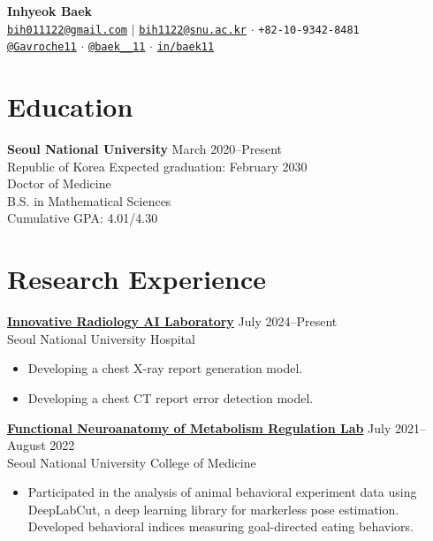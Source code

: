 \documentclass[10pt, a4paper]{article}
\newenvironment{customitemize}
	{\begin{itemize}[leftmargin=*, noitemsep, topsep=0pt, label=$\cdot$]}
	{\end{itemize}}
\begin{document}
\begin{center}
    {\Large\textbf{\color{mycolor}Inhyeok Baek}} \\[2mm]
    \small
    \faEnvelope\hspace{1mm}\href{mailto:bih011122@gmail.com}{\texttt{bih011122@gmail.com}} $\vert$ \href{mailto:bih1122@snu.ac.kr}{\texttt{bih1122@snu.ac.kr}}
    \hspace{2mm}$\cdot$\hspace{2mm}
    \faPhone\hspace{1mm}\texttt{+82-10-9342-8481} \\[1mm]
    \faGithub\hspace{1mm}\href{https://github.com/gavroche11}{\texttt{@Gavroche11}}
    \hspace{2mm}$\cdot$\hspace{2mm}
    {}\hspace{1mm}\href{https://x.com/baek__11}{\texttt{@baek\_\_11}}
    \hspace{2mm}$\cdot$\hspace{2mm}
    \faLinkedin\hspace{1mm}\href{https://www.linkedin.com/in/baek11/}{\texttt{in/baek11}}
\end{center}

\section*{Education}
\textbf{Seoul National University} \hfill March 2020--Present \\
Republic of Korea \hfill Expected graduation: February 2030 \smallskip\\
Doctor of Medicine\\
B.S. in Mathematical Sciences \smallskip\\
Cumulative GPA: 4.01/4.30

\section*{Research Experience}
\textbf{\href{http://irail.snu.ac.kr}{Innovative Radiology AI Laboratory}} \hfill July 2024--Present\\
Seoul National University Hospital \smallskip
\begin{customitemize}
    \item Developing a chest X-ray report generation model.
    \item Developing a chest CT report error detection model.
\end{customitemize}
\bigskip
\textbf{\href{https://fnmr.snu.ac.kr/}{Functional Neuroanatomy of Metabolism Regulation Lab}} \hfill July 2021--August 2022\\
Seoul National University College of Medicine \smallskip
\begin{customitemize}
    \item Participated in the analysis of animal behavioral experiment data using DeepLabCut, a deep learning library for markerless pose estimation. Developed behavioral indices measuring goal-directed eating behaviors.
\end{customitemize}
\end{document}
